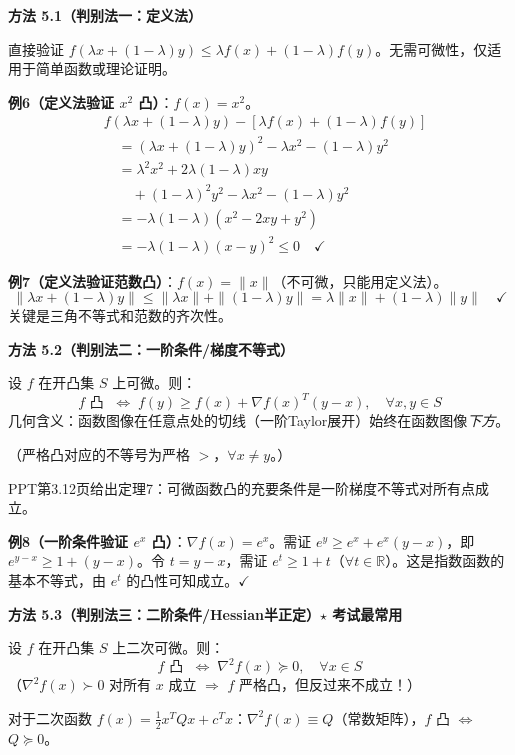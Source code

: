\begin{defbox}
\textbf{方法 5.1（判别法一：定义法）}

直接验证 $f(\lambda x+(1-\lambda)y) \le \lambda f(x)+(1-\lambda)f(y)$。无需可微性，仅适用于简单函数或理论证明。
\end{defbox}

\textbf{例6（定义法验证 $x^2$ 凸）}：$f(x)=x^2$。
{\small
\begin{align*}
& f(\lambda x+(1-\lambda)y) - [\lambda f(x)+(1-\lambda)f(y)] \\
&\quad = (\lambda x+(1-\lambda)y)^2 - \lambda x^2 - (1-\lambda)y^2 \\
&\quad = \lambda^2 x^2 + 2\lambda(1-\lambda)xy \\
&\qquad + (1-\lambda)^2 y^2 - \lambda x^2 - (1-\lambda)y^2 \\
&\quad = -\lambda(1-\lambda)(x^2 - 2xy + y^2) \\
&\quad = -\lambda(1-\lambda)(x-y)^2 \le 0 \quad\checkmark
\end{align*}
}

\textbf{例7（定义法验证范数凸）}：$f(x)=\|x\|$（不可微，只能用定义法）。
{\small
\[
\|\lambda x+(1-\lambda)y\| \le \|\lambda x\| + \|(1-\lambda)y\|
= \lambda\|x\| + (1-\lambda)\|y\| \quad\checkmark
\]
}
关键是三角不等式和范数的齐次性。

\begin{defbox}
\textbf{方法 5.2（判别法二：一阶条件/梯度不等式）}

设 $f$ 在开凸集 $S$ 上可微。则：
{\small
\[
f \text{ 凸 } \;\Longleftrightarrow\;
f(y) \ge f(x) + \nabla f(x)^T(y-x),\quad \forall x,y\in S
\]
}
几何含义：函数图像在任意点处的切线（一阶Taylor展开）始终在函数图像\emph{下方}。

（严格凸对应的不等号为严格 $>$，$\forall x\neq y$。）
\end{defbox}

\medskip
PPT第3.12页给出定理7：可微函数凸的充要条件是一阶梯度不等式对所有点成立。
\medskip
{}
\medskip

\textbf{例8（一阶条件验证 $e^x$ 凸）}：$\nabla f(x)=e^x$。需证 $e^y \ge e^x + e^x(y-x)$，即 $e^{y-x} \ge 1+(y-x)$。令 $t=y-x$，需证 $e^t \ge 1+t$（$\forall t\in\mathbb{R}$）。这是指数函数的基本不等式，由 $e^t$ 的凸性可知成立。$\checkmark$

\begin{defbox}
\textbf{方法 5.3（判别法三：二阶条件/Hessian半正定）\quad $\star$ 考试最常用}

设 $f$ 在开凸集 $S$ 上二次可微。则：
\[
f \text{ 凸 } \;\Longleftrightarrow\; \nabla^2 f(x) \succeq 0,\quad \forall x\in S
\]
（$\nabla^2 f(x) \succ 0$ 对所有 $x$ 成立 $\Longrightarrow$ $f$ 严格凸，但反过来不成立！）

对于二次函数 $f(x)=\frac12 x^T Q x + c^T x$：$\nabla^2 f(x) \equiv Q$（常数矩阵），$f$ 凸 $\Longleftrightarrow$ $Q \succeq 0$。
\end{defbox}

